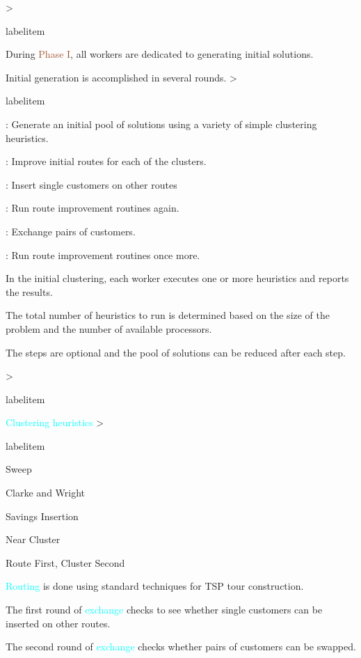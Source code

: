 \documentclass[headrule,landscape]{foils}
\makeatletter
\def\blu#1{\textcolor{blue}{#1}}
\def\cyn#1{\textcolor{cyan}{#1}}
\def\brn#1{\textcolor{sienna}{#1}}
\newcommand{\foil}[1]{\foilhead[-.6in]{\blu{#1}}}
\newcommand{\bi}{\begin{itemize}}
\newcommand{\ei}{\end{itemize}}
\newcommand{\bb}{\item}
\renewenvironment{itemize}[1][0pt]{%
  \ifnum \@itemdepth >\thr@@\@toodeep\else
    \advance\@itemdepth\@ne
    \edef\@itemitem{labelitem\romannumeral\the\@itemdepth}%
    \expandafter
    \list
      \csname\@itemitem\endcsname
      {\def\makelabel##1{\hss\llap{##1}}}\itemsep=#1%
  \fi
}{\endlist}
\makeatother
\begin{document}

\foil{Heuristics: Generating Initial Solutions}

\bi
\bb During \brn{Phase I}, all workers are dedicated to generating initial
solutions.  
\bb Initial generation is accomplished in several rounds.
\bi
\bb \underbar{\cyn{Clustering}}: Generate an initial pool of solutions using a
  variety of simple clustering heuristics.
\bb \underbar{\cyn{Routing}}: Improve initial routes for each of the clusters.   
\bb \underbar{\cyn{Exchange}}: Insert single customers on other routes
\bb \underbar{\cyn{Routing}}: Run route improvement routines again.
\bb \underbar{\cyn{Exchange}}: Exchange pairs of customers.
\bb \underbar{\cyn{Routing}}: Run route improvement routines once more.
\ei
\bb In the initial clustering, each worker executes one or
more heuristics and reports the results.
\bb The total number of heuristics to run is determined based on the size of
the problem and the number of available processors.
\bb The steps are optional and the pool of solutions can be reduced after each
step.
\ei 


\foil{Heuristics: Initial Solutions for the CVRP}

\bi
\bb \cyn{Clustering heuristics}
\bi
\bb Sweep
\bb Clarke and Wright
\bb Savings Insertion
\bb Near Cluster
\bb Route First, Cluster Second
\ei
\bb \cyn{Routing} is done using standard techniques for TSP tour construction.
\bb The first round of \cyn{exchange} checks to see whether single customers
can be inserted on other routes.
\bb The second round of \cyn{exchange} checks whether pairs of customers can
be swapped.
\ei

\end{document}

